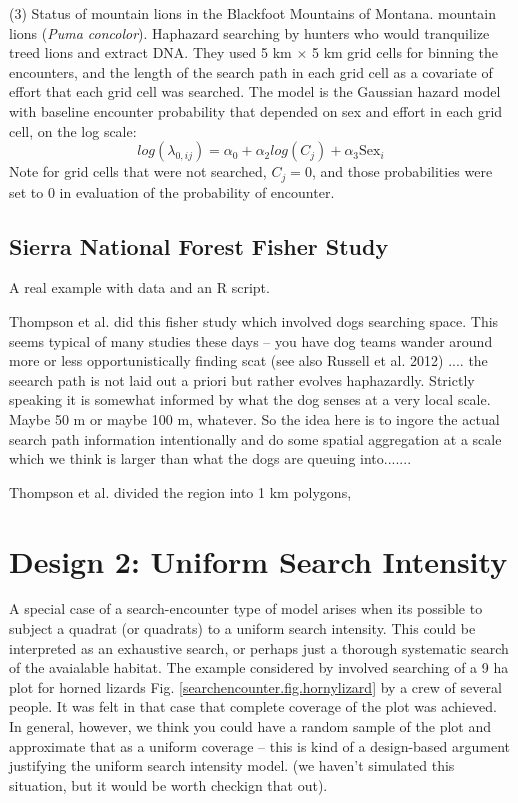 (3) Status of mountain lions in the Blackfoot Mountains of  Montana.
\citet{russell_etal:2012} mountain lions ({\it Puma
  concolor}). Haphazard searching by hunters who would tranquilize
treed lions and extract DNA.
They used 5 km $\times$ 5 km grid cells for binning the encounters,
and the length of the search path in each grid cell as a covariate of
effort that each grid cell was searched.
The model is the Gaussian hazard model with baseline encounter
probability that depended on sex and effort in each grid cell, on the
log scale:
\[
 log(\lambda_{0,ij}) =
\alpha_{0} + \alpha_{2} log(C_{j}) + \alpha_{3} \mbox{Sex}_{i}
\]
Note for grid cells that were not searched, $C_{j} =0$, and those
probabilities were set to 0 in evaluation of the probability of
encounter.







\subsection{Sierra National Forest Fisher Study}

A real example with data and an R script. 

Thompson et al. did this fisher study which involved dogs searching
space. This seems typical of many
studies these days -- you have dog teams wander around more or less
opportunistically finding scat
(see also Russell et al. 2012) .... the seearch path is not laid out a
priori but rather evolves haphazardly.  Strictly speaking it is
somewhat informed by what the dog senses at a very local scale. Maybe
50 m or maybe 100 m, whatever.
So the idea here is to ingore the actual search path information
intentionally and do some spatial aggregation at a scale which we
think is larger than what the dogs are queuing into.......

Thompson et al. divided the region into 1 km polygons,






\section{Design 2: Uniform Search Intensity}

A special case of a search-encounter type of model arises when its
possible to subject a quadrat (or quadrats) to a uniform search
intensity. This could be interpreted as an exhaustive search, or
perhaps just a thorough systematic search of the avaialable habitat.
The example considered by \citet{royle_young:2008} involved searching
of a 9 ha plot for horned lizards Fig.
\ref{searchencounter.fig.hornylizard} by a crew of
several people. It was felt in that case that complete coverage of
the plot was achieved. In general, however, we think you could have
a random sample of the plot and approximate that as a uniform coverage
-- this is kind of a design-based argument justifying the uniform
search intensity model. (we haven't simulated this situation, but it
would be worth checkign that out).

